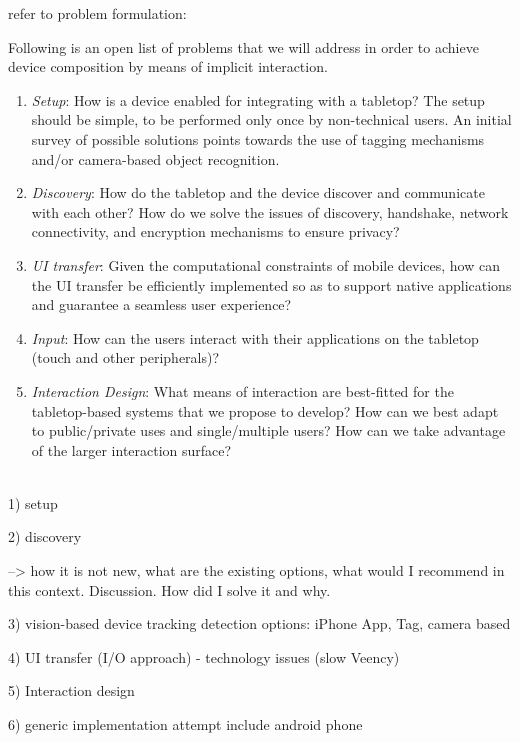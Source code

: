 

refer to problem formulation:

Following is an open list of problems that we will address in order to achieve device composition by means of implicit interaction.
\begin{enumerate}
\item{\emph{Setup}: How is a device enabled for integrating with a tabletop?
The setup should be simple, to be performed only once by non-technical users.
An initial survey of possible solutions points towards the use of tagging mechanisms and/or camera-based object recognition.}
\item{\emph{Discovery}: How do the tabletop and the device discover and communicate with each other?
How do we solve the issues of discovery, handshake, network connectivity, and encryption mechanisms to ensure privacy?}
\item{\emph{UI transfer}: Given the computational constraints of mobile devices, how can the UI transfer be efficiently implemented so as to support native applications and guarantee a seamless user experience?}
\item{\emph{Input}: How can the users interact with their applications on the tabletop (touch and other peripherals)?}
\item{\emph{Interaction Design}: What means of interaction are best-fitted for the tabletop-based systems that we propose to develop?
How can we best adapt to public/private uses and single/multiple users?
How can we take advantage of the larger interaction surface?}
\end{enumerate}

\hfill\\

1) setup

2) discovery

--> how it is not new, what are the existing options, what would I recommend in this context. Discussion. How did I solve it and why.

3) vision-based device tracking
detection options: iPhone App, Tag, camera based 

4) UI transfer (I/O approach)
- technology issues (slow Veency)

5) Interaction design

6) generic implementation attempt 
include android phone